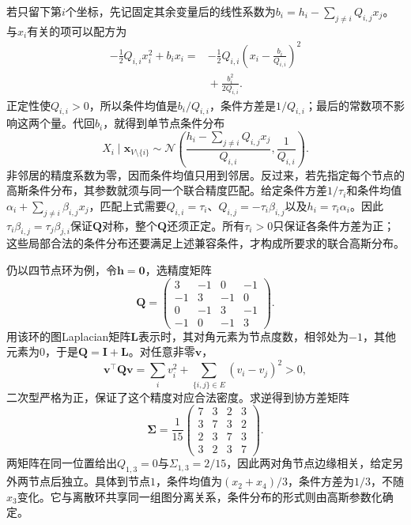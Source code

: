若只留下第$i$个坐标，先记固定其余变量后的线性系数为$b_i=h_i-\sum_{j\neq i}Q_{i,j}x_j$。与$x_i$有关的项可以配方为
\[
  \begin{aligned}
    -\tfrac12Q_{i,i}x_i^2+b_i x_i
    ={}&-\tfrac12Q_{i,i}
          \left(x_i-\frac{b_i}{Q_{i,i}}\right)^2\\
       &{}+\frac{b_i^2}{2Q_{i,i}}.
  \end{aligned}
\]
正定性使$Q_{i,i}>0$，所以条件均值是$b_i/Q_{i,i}$，条件方差是$1/Q_{i,i}$；最后的常数项不影响这两个量。代回$b_i$，就得到单节点条件分布
\begin{equation}
  X_i\mid\bm{x}_{V\setminus\{i\}}
  \sim\mathcal{N}\left(
    \frac{h_i-\sum_{j\neq i}Q_{i,j}x_j}{Q_{i,i}},
    \frac{1}{Q_{i,i}}\right).
  \label{eq:pgm-undirected-gaussian-conditional}
\end{equation}
非邻居的精度系数为零，因而条件均值只用到邻居。反过来，若先指定每个节点的高斯条件分布，其参数就须与同一个联合精度匹配。给定条件方差$1/\tau_i$和条件均值$\alpha_i+\sum_{j\neq i}\beta_{i,j}x_j$，匹配上式需要$Q_{i,i}=\tau_i$、$Q_{i,j}=-\tau_i\beta_{i,j}$以及$h_i=\tau_i\alpha_i$。因此$\tau_i\beta_{i,j}=\tau_j\beta_{j,i}$保证$\bm{Q}$对称，整个$\bm{Q}$还须正定。所有$\tau_i>0$只保证各条件方差为正；这些局部合法的条件分布还要满足上述兼容条件，才构成所要求的联合高斯分布。

仍以四节点环为例，令$\bm{h}=\bm{0}$，选精度矩阵
\[
  \bm{Q}=
  \begin{pmatrix}
    3&-1&0&-1\\
    -1&3&-1&0\\
    0&-1&3&-1\\
    -1&0&-1&3
  \end{pmatrix}.
\]
用该环的图Laplacian矩阵$\bm{L}$表示时，其对角元素为节点度数，相邻处为$-1$，其他元素为$0$，于是$\bm{Q}=\bm{I}+\bm{L}$。对任意非零$\bm{v}$，
\[
  \bm{v}^{\top}\bm{Q}\bm{v}
  =\sum_i v_i^2+\sum_{\{i,j\}\in E}(v_i-v_j)^2>0,
\]
二次型严格为正，保证了这个精度对应合法密度。求逆得到协方差矩阵
\[
  \bm{\Sigma}=\frac{1}{15}
  \begin{pmatrix}
    7&3&2&3\\
    3&7&3&2\\
    2&3&7&3\\
    3&2&3&7
  \end{pmatrix}.
\]
两矩阵在同一位置给出$Q_{1,3}=0$与$\Sigma_{1,3}=2/15$，因此两对角节点边缘相关，给定另外两节点后独立。具体到节点$1$，条件均值为$(x_2+x_4)/3$，条件方差为$1/3$，不随$x_3$变化。它与离散环共享同一组图分离关系，条件分布的形式则由高斯参数化确定。


